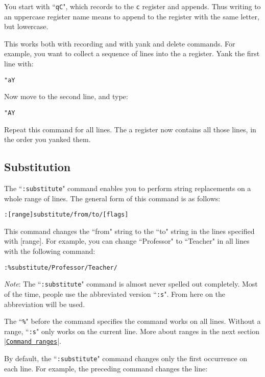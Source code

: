 You start with ``\texttt{qC}", which records to the \texttt{c} register and appends.
Thus writing to an uppercase register name means to append to the register with the same letter, but lowercase.

This works both with recording and with yank and delete commands.
For example, you want to collect a sequence of lines into the a register.
Yank the first line with:

\begin{Verbatim}[samepage=true]
 "aY
\end{Verbatim}

Now move to the second line, and type:

\begin{Verbatim}[samepage=true]
 "AY
\end{Verbatim}

Repeat this command for all lines.
The a register now contains all those lines, in the order you yanked them.

\subsection{Substitution}
\label{find-replace}
The ``\texttt{:substitute}" command enables you to perform string replacements on a whole range of lines.
The general form of this command is as follows:

\begin{Verbatim}[samepage=true]
 :[range]substitute/from/to/[flags]
\end{Verbatim}

This command changes the ``from" string to the ``to" string in the lines specified with [range].
For example, you can change ``Professor" to ``Teacher" in all lines with the following command:

\begin{Verbatim}[samepage=true]
 :%substitute/Professor/Teacher/
\end{Verbatim}

\emph{Note}: The ``\texttt{:substitute}" command is almost never spelled out completely.
Most of the time, people use the abbreviated version ``\texttt{:s}".
From here on the abbreviation will be used.

The ``\texttt{\%}" before the command specifies the command works on all lines.
Without a range, ``\texttt{:s}" only works on the current line.
More about ranges in the next section |\hyperref[Command ranges]{\texttt{Command ranges}}|.

By default, the ``\texttt{:substitute}" command changes only the first occurrence on each line.
For example, the preceding command changes the line:

